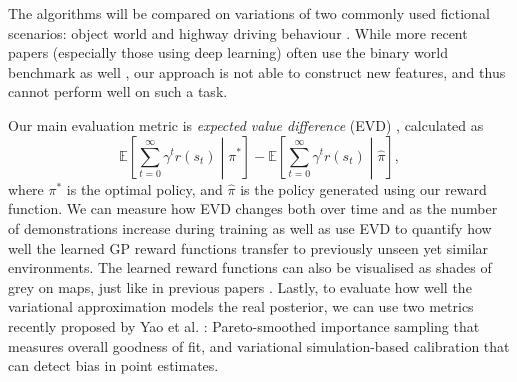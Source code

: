 \documentclass{mprop}
\theoremstyle{definition}
\begin{document}
The algorithms will be compared on variations of two commonly used fictional
scenarios: object world \cite{DBLP:conf/nips/LevinePK11} and highway driving
behaviour \cite{DBLP:conf/icml/PieterN04,DBLP:conf/nips/LevinePK10}. While more
recent papers (especially those using deep learning) often use the binary world
benchmark as well \cite{DBLP:conf/uai/JinDAS17,wulfmeier2015maximum}, our
approach is not able to construct new features, and thus cannot perform well on
such a task.

Our main evaluation metric is \emph{expected value difference} (EVD)
\cite{DBLP:conf/uai/JinDAS17}, calculated as
\[ \mathbb{E} \left[ \sum_{t=0}^\infty \gamma^tr(s_t) \middle| \pi^* \right] -
  \mathbb{E} \left[ \sum_{t=0}^\infty \gamma^t r(s_t) \middle| \hat\pi
  \right], \]
where $\pi^*$ is the optimal policy, and $\hat\pi$ is the policy generated using
our reward function. We can measure how EVD changes both over time and as the
number of demonstrations increase during training as well as use EVD to quantify
how well the learned GP reward functions transfer to previously unseen yet
similar environments. The learned reward functions can also be visualised as
shades of grey on maps, just like in previous papers
\cite{DBLP:conf/uai/JinDAS17,DBLP:conf/nips/LevinePK11}. Lastly, to evaluate how
well the variational approximation models the real posterior, we can use two
metrics recently proposed by Yao et al. \cite{DBLP:conf/icml/YaoVSG18}:
Pareto-smoothed importance sampling that measures overall goodness of fit, and
variational simulation-based calibration that can detect bias in point
estimates.



\end{document}

